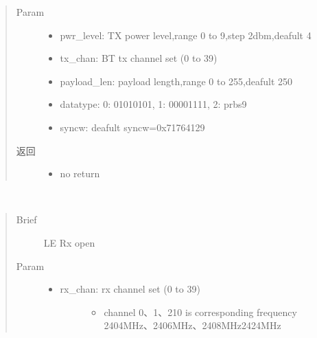 \documentclass[letterpaper,10pt,english]{sphinxhowto}
\begin{document}
\begin{fulllineitems}
\begin{fulllineitems}
\begin{quote}
\begin{description}
\item[{Param}] \leavevmode\begin{itemize}
\item {} 
pwr\_level: TX power level,range 0 to 9,step 2dbm,deafult 4

\item {} 
tx\_chan: BT tx channel set (0 to 39)

\item {} 
payload\_len: payload length,range 0 to 255,deafult 250

\item {} 
datatype: 0: 01010101, 1: 00001111, 2: prbs9

\item {} 
syncw: deafult syncw=0x71764129

\end{itemize}

\item[{返回}] \leavevmode
\begin{itemize}
\item {} 
no return

\end{itemize}


\end{description}\end{quote}

\end{fulllineitems}


\begin{fulllineitems}
\label{\detokenize{rfapi/index:bt_api.BTAPI.rw_le_rx_per}}~\begin{quote}\begin{description}
\item[{Brief}] \leavevmode
LE Rx open

\item[{Param}] \leavevmode\begin{itemize}
\item {} \begin{description}
\item[{rx\_chan: rx channel set (0 to 39)}] \leavevmode\begin{itemize}
\item {} 
channel 0、1、2\textendash{}10 is corresponding frequency 2404MHz、2406MHz、2408MHz\textendash{}2424MHz


\end{itemize}
\end{description}
\end{itemize}
\end{description}
\end{quote}
\end{fulllineitems}
\end{fulllineitems}
\end{document}
